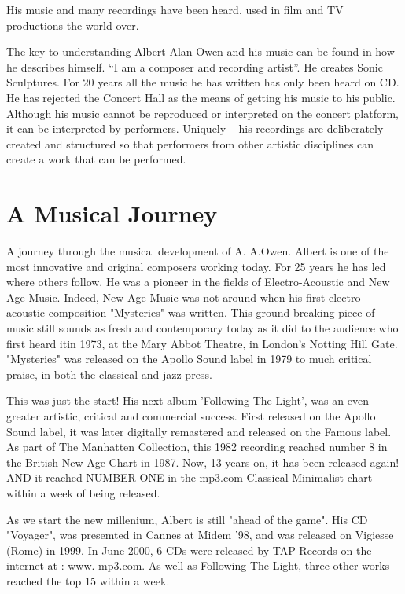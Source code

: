 \documentclass{article}
\begin{document}
His music and many recordings have been heard, used in film and TV productions the world over.

The key to understanding Albert Alan Owen and his music can be found in how he describes himself.
“I am a composer and recording artist”.
He creates Sonic Sculptures.
For 20 years all the music he has written has only been heard on CD.
He has rejected the Concert Hall as the means of getting his music to his public.
Although his music cannot be reproduced or interpreted on the concert platform, it can be interpreted by performers.
Uniquely – his recordings are deliberately created and structured so that performers from other artistic disciplines can create a work that can be performed.

\pagebreak
\section{A Musical Journey}

A journey through the musical development of A.
A.Owen.
Albert is one of the most innovative and original composers working today.
For 25 years he has led where others follow.
He was a pioneer in the fields of Electro-Acoustic and New Age Music.
Indeed, New Age Music was not around when his first electro-acoustic composition "Mysteries" was written.
This ground breaking piece of music still sounds as fresh and contemporary today as it did to the audience who first heard itin 1973, at the Mary Abbot Theatre, in London's Notting Hill Gate.
"Mysteries" was released on the Apollo Sound label in 1979 to much critical praise, in both the classical and jazz press.

This was just the start! His next album 'Following The Light', was an even greater artistic, critical and commercial success.
First released on the Apollo Sound label, it was later digitally remastered and released on the Famous label.
As part of The Manhatten Collection, this 1982 recording reached number 8 in the British New Age Chart in 1987.
Now, 13 years on, it has been released again! AND it reached NUMBER ONE in the mp3.com Classical Minimalist chart within a week of being released.

As we start the new millenium, Albert is still "ahead of the game".
His CD "Voyager", was presemted in Cannes at Midem '98, and was released on Vigiesse (Rome) in 1999.
In June 2000, 6 CDs were released by TAP Records on the internet at : www.
mp3.com.
As well as Following The Light, three other works reached the top 15 within a week.
\end{document}
